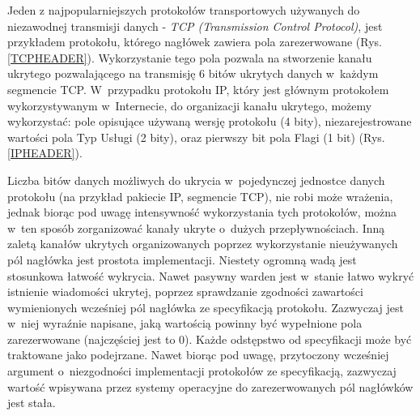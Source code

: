 \documentclass[a4paper, twoside, 12pt]{report}
\begin{document}
        Jeden z najpopularniejszych protokołów transportowych używanych do niezawodnej
        transmisji danych - \emph{TCP (Transmission Control Protocol)}, jest przykładem protokołu,
        którego nagłówek zawiera pola zarezerwowane (Rys. \ref{TCPHEADER}).
        Wykorzystanie tego pola pozwala na stworzenie kanału ukrytego pozwalającego
        na transmisję 6 bitów ukrytych danych w~każdym segmencie TCP. W~przypadku protokołu
        IP, który jest głównym protokołem wykorzystywanym w~Internecie, do organizacji
        kanału ukrytego, możemy wykorzystać: pole
        opisujące używaną wersję protokołu (4 bity), niezarejestrowane wartości pola Typ Usługi (2 bity),
        oraz pierwszy bit pola Flagi (1 bit) (Rys. \ref{IPHEADER})\cite{IPRFC}.

        Liczba bitów danych
        możliwych do ukrycia w~pojedynczej jednostce danych protokołu (na przykład pakiecie IP, segmencie TCP),
        nie robi może wrażenia, jednak biorąc
        pod uwagę intensywność wykorzystania tych protokołów, można w~ten sposób
        zorganizować kanały ukryte o~dużych przepływnościach. Inną zaletą kanałów ukrytych organizowanych
        poprzez wykorzystanie nieużywanych pól nagłówka jest prostota implementacji.
        Niestety ogromną wadą jest stosunkowa
        łatwość wykrycia. Nawet pasywny warden jest w~stanie łatwo wykryć istnienie wiadomości
        ukrytej, poprzez sprawdzanie zgodności zawartości wymienionych wcześniej pól
        nagłówka ze specyfikacją protokołu. Zazwyczaj jest w~niej wyraźnie napisane,
        jaką wartością powinny być wypełnione pola zarezerwowane (najczęściej jest to 0).
        Każde odstępstwo od specyfikacji może być traktowane jako podejrzane. Nawet biorąc
        pod uwagę, przytoczony wcześniej argument o~niezgodności implementacji protokołów
        ze specyfikacją, zazwyczaj wartość wpisywana przez systemy operacyjne do
        zarezerwowanych pól nagłówków jest stała.
\end{document}
